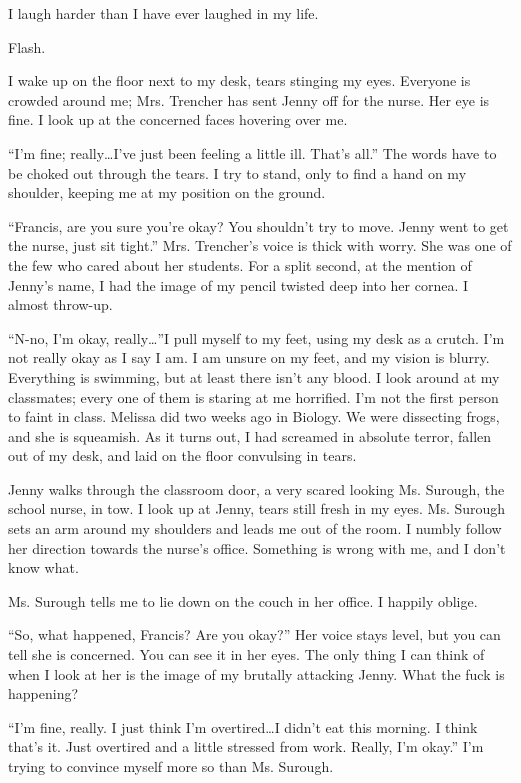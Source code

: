 I laugh harder than I have ever laughed in my life.



Flash.



I wake up on the floor next to my desk, tears stinging my eyes.
Everyone is crowded around me; Mrs. Trencher has sent Jenny off for
the nurse. Her eye is fine. I look up at the concerned faces
hovering over me.

``I'm fine; really{\ldots}I've just been feeling a
little ill. That's all.'' The words have to be choked
out through the tears. I try to stand, only to find a hand on my
shoulder, keeping me at my position on the ground.

``Francis, are you sure you're okay? You shouldn't
try to move. Jenny went to get the nurse, just sit tight.''
Mrs. Trencher's voice is thick with worry. She was one of the
few who cared about her students. For a split second, at the
mention of Jenny's name, I had the image of my pencil twisted
deep into her cornea. I almost throw-up.

``N-no, I'm okay, really{\ldots}''I pull myself to
my feet, using my desk as a crutch. I'm not really okay as I
say I am. I am unsure on my feet, and my vision is blurry.
Everything is swimming, but at least there isn't any blood. I
look around at my classmates; every one of them is staring at me
horrified. I'm not the first person to faint in class.
Melissa did two weeks ago in Biology. We were dissecting frogs, and
she is squeamish. As it turns out, I had screamed in absolute
terror, fallen out of my desk, and laid on the floor convulsing in
tears.

Jenny walks through the classroom door, a very scared looking Ms.
Surough, the school nurse, in tow. I look up at Jenny, tears still
fresh in my eyes. Ms. Surough sets an arm around my shoulders and
leads me out of the room. I numbly follow her direction towards the
nurse's office. Something is wrong with me, and I don't
know what.

Ms. Surough tells me to lie down on the couch in her office. I
happily oblige.

``So, what happened, Francis? Are you okay?'' Her voice
stays level, but you can tell she is concerned. You can see it in
her eyes. The only thing I can think of when I look at her is the
image of my brutally attacking Jenny. What the fuck is
happening?

``I'm fine, really. I just think I'm
overtired{\ldots}I didn't eat this morning. I think
that's it. Just overtired and a little stressed from work.
Really, I'm okay.'' I'm trying to convince myself
more so than Ms. Surough.

